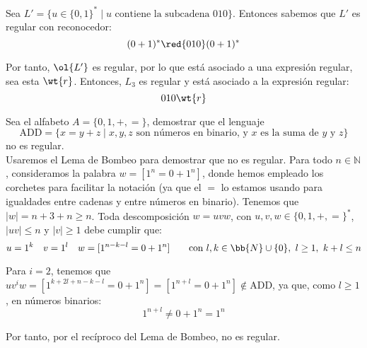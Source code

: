 \begin{ejercicio}
\begin{enumerate}
        Sea $L'=\{u\in \{0,1\}^\ast \mid u \text{ contiene la subcadena } 010\}$. Entonces sabemos que $L'$ es regular con reconocedor:
        \begin{equation*}
            (0+1)^*\red{010}(0+1)^*
        \end{equation*}

        Por tanto, $\ol{L'}$ es regular, por lo que está asociado a una expresión regular, sea esta $\wt{r}$. Entonces, $L_3$ es regular y está asociado a la expresión regular:
        \begin{equation*}
            010\wt{r}
        \end{equation*}
    \end{enumerate}
\end{ejercicio}

\begin{ejercicio}\label{ej:1.3.5}
    Sea el alfabeto $A=\{0,1,+,=\}$, demostrar que el lenguaje
    \begin{equation*}
        \text{ADD} = \{x=y+z \mid x,y,z \text{ son números en binario, y } x \text{ es la suma de  } y \text{ y } z\}
    \end{equation*}
    no es regular.\\

    Usaremos el Lema de Bombeo para demostrar que no es regular. Para todo $n\in \mathbb{N}$, consideramos la palabra $w=[1^n = 0+1^n]$, donde hemos empleado los corchetes para facilitar la notación (ya que el $=$ lo estamos usando para igualdades entre cadenas y entre números en binario). Tenemos que $|w|=n+3+n\geq n$. Toda descomposición $w=uvw$, con $u,v,w\in \{0,1,+,=\}^\ast$, $|uv|\leq n$ y $|v|\geq 1$ debe cumplir que:
    \begin{equation*}
        u=1^k \quad v=1^l \quad w=[1^{n-k-l} = 0+1^n] \qquad \text{con } l,k\in \bb{N}\cup \{0\},~l\geq 1,~k+l\leq n
    \end{equation*}

    Para $i=2$, tenemos que $uv^iw=[1^{k+2l+n-k-l} = 0+1^n]=[1^{n+l} = 0+1^n]\notin \text{ADD}$, ya que, como $l\geq 1$, en números binarios:
    \begin{equation*}
        1^{n+l} \neq 0+1^n=1^n
    \end{equation*}

    Por tanto, por el recíproco del Lema de Bombeo, no es regular.
\end{ejercicio}

